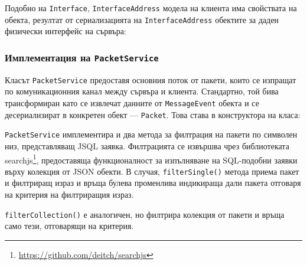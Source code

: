 \documentclass[12pt,a4paper,oneside]{book}
\begin{document}


Подобно на \texttt{Interface}, \texttt{InterfaceAddress} модела на клиента
има свойствата на обекта, резултат от сериализацията на
\texttt{InterfaceAddress} обектите за даден физически интерфейс на сървъра:



\subsubsection{Имплементация на \texttt{PacketService}}

Класът \texttt{PacketService} предоставя основния поток от пакети, които се
изпращат по комуникационния канал между сървъра и клиента. Стандартно, той бива
трансформиран като се извлечат данните от \texttt{MessageEvent} обекта и се десериализират
в конкретен обект --- \texttt{Packet}. Това става в конструктора на класа:



\texttt{PacketService} имплементира и два метода за филтрация на пакети по символен низ,
представляващ JSQL заявка. Филтрацията се извършва чрез библиотеката
searchjs\footnote{\url{https://github.com/deitch/searchjs}},
предоставяща функционалност за изпълняване на SQL-подобни заявки върху колекция
от JSON обекти. В случая, \texttt{filterSingle()} метода приема пакет и
филтриращ израз и връща булева променлива индикираща дали пакета отговаря на
критерия на филтриращия израз.



\texttt{filterCollection()} е аналогичен, но
филтрира колекция от пакети и връща само тези, отговарящи на критерия.


\end{document}
